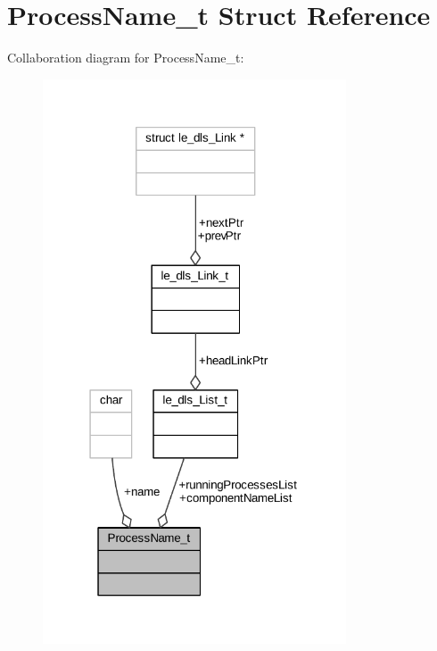 \hypertarget{struct_process_name__t}{}\section{Process\+Name\+\_\+t Struct Reference}
\label{struct_process_name__t}


Collaboration diagram for Process\+Name\+\_\+t\+:
\nopagebreak
\begin{figure}[H]
\begin{center}
\leavevmode
\includegraphics[width=255pt]{struct_process_name__t__coll__graph}
\end{center}
\end{figure}
